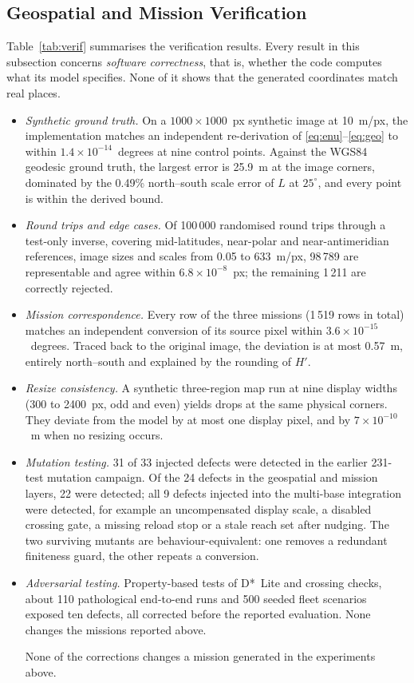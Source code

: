 \subsection{Geospatial and Mission Verification}
\label{sec:verres}
Table~\ref{tab:verif} summarises the verification results. Every result in this subsection concerns \emph{software correctness}, that is, whether the code computes what its model specifies. None of it shows that the generated coordinates match real places.
\begin{itemize}
\item \emph{Synthetic ground truth.} On a $1000\times1000$~px synthetic image at 10~m/px, the implementation matches an independent re-derivation of \eqref{eq:enu}--\eqref{eq:geo} to within $1.4\times10^{-14}$~degrees at nine control points. Against the WGS84 geodesic ground truth, the largest error is 25.9~m at the image corners, dominated by the 0.49\% north--south scale error of $L$ at $25^\circ$, and every point is within the derived bound.
\item \emph{Round trips and edge cases.} Of 100\,000 randomised round trips through a test-only inverse, covering mid-latitudes, near-polar and near-antimeridian references, image sizes and scales from 0.05 to 633~m/px, 98\,789 are representable and agree within $6.8\times10^{-8}$~px; the remaining 1\,211 are correctly rejected.
\item \emph{Mission correspondence.} Every row of the three missions (1\,519 rows in total) matches an independent conversion of its source pixel within $3.6\times10^{-15}$~degrees. Traced back to the original image, the deviation is at most 0.57~m, entirely north--south and explained by the rounding of $H'$.
\item \emph{Resize consistency.} A synthetic three-region map run at nine display widths (300 to 2400~px, odd and even) yields drops at the same physical corners. They deviate from the model by at most one display pixel, and by $7\times10^{-10}$~m when no resizing occurs.
\item \emph{Mutation testing.} 31 of 33 injected defects were detected in the earlier 231-test mutation campaign. Of the 24 defects in the geospatial and mission layers, 22 were detected; all 9 defects injected into the multi-base integration were detected, for example an uncompensated display scale, a disabled crossing gate, a missing reload stop or a stale reach set after nudging. The two surviving mutants are behaviour-equivalent: one removes a redundant finiteness guard, the other repeats a conversion.
\item \emph{Adversarial testing.} Property-based tests of D*~Lite and crossing checks, about 110 pathological end-to-end runs and 500 seeded fleet scenarios exposed ten defects, all corrected before the reported evaluation. None changes the missions reported above.

None of the corrections changes a mission generated in the experiments above.
\end{itemize}

